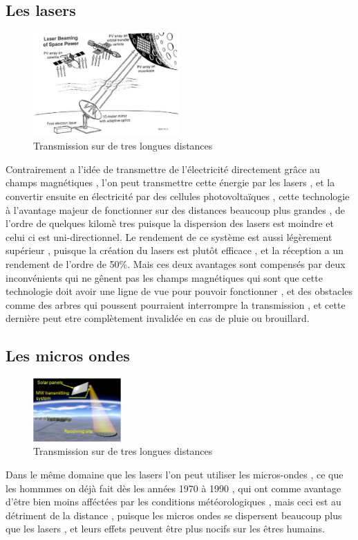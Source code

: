 \documentclass[12pt]{report}
\begin{document}
  \subsection{Les lasers}
\begin{figure}
  \begin{center}
    \includegraphics[width=0.5\textwidth]{laser}
  \end{center}
  \caption{Transmission sur de tres longues distances}
\end{figure}Contrairement a l'idée de transmettre de l'électricité directement grâce au champs magnétiques , l'on peut transmettre cette énergie par les lasers  , et la convertir ensuite en électricité par des cellules photovoltaïques , cette technologie à l'avantage majeur de fonctionner sur des distances beaucoup plus grandes , de l'ordre de quelques kilomè tres puisque la dispersion des lasers est moindre et celui ci est uni-directionnel. Le rendement de ce système est aussi légèrement supérieur , puisque la création du lasers est plutôt efficace , et la réception a un rendement de l'ordre de 50\%. Mais ces deux avantages sont compensés par deux inconvénients qui ne gênent pas les champs magnétiques qui sont que cette technologie doit avoir une ligne de vue pour pouvoir fonctionner , et des obstacles comme des arbres qui poussent pourraient interrompre la transmission , et cette dernière peut etre complètement invalidée en cas de pluie ou brouillard.
    \subsection{Les micros ondes}
\begin{figure}
  \begin{center}
    \includegraphics[width=0.3\textwidth]{microwave}
  \end{center}
  \caption{Transmission sur de tres longues distances}
\end{figure}Dans le même domaine que les lasers l'on peut utiliser les micros-ondes , ce que les hommmes on déjà fait dès les années 1970 à 1990 , qui ont comme avantage d'être bien moins afféctées par les conditions météorologiques , mais ceci est au détriment de la distance , puisque les micros ondes se dispersent beaucoup plus que les lasers , et leurs effets peuvent être plus nocifs sur les êtres humains.
\end{document}
